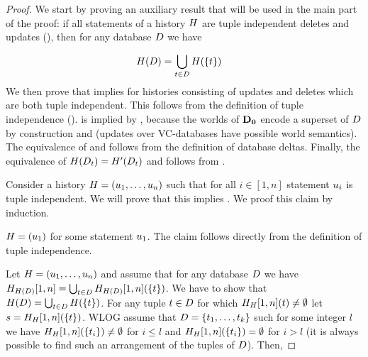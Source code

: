 \begin{proof}
  We start by proving an auxiliary result that will be used in the main part of the proof: if all statements of a history $H$ are tuple independent deletes and updates (), then for any database $D$ we have

  \begin{align}
    \label{eq:history-TI}
    H(D) &= \bigcup_{t \in D} H(\{t\})
  \end{align}
  We then prove that   implies  for histories consisting of updates and deletes which are both tuple independent. This follows from the definition of tuple independence ().  is implied by , because the  worlds of $\mathbf{D_0}$ encode a superset of $D$ by construction and  (updates over  VC-databases have possible world semantics). The equivalence of  and  follows from the definition of database deltas. Finally, the equivalence of $H(D_{t}) = H'(D_{t})$ and  follows from .

    Consider a history $H = (u_1, \ldots, u_n)$ such that for all $i \in [1,n]$ statement $u_i$ is tuple independent.  We will prove that this implies . We proof this claim by induction.

  $H = (u_1)$ for some statement $u_1$. The claim follows directly from the definition of tuple independence.

  Let $H = (u_1, \ldots, u_n)$ and assume that for any database $D$ we have $ H_{H(D)}{[1,n]} = \bigcup_{t \in D} H_{H(D)}{[1,n]}(\{t\})$. We have to show that $H(D) = \bigcup_{t \in D} H(\{t\})$. For any tuple $t \in D$ for which $H_{H}{[1,n]}(t) \neq \emptyset$  let $s = H_{H}{[1,n]}(\{t\})$. WLOG assume that $D = \{t_1, \ldots, t_k\}$ such for some integer $l$ we have $H_{H}{[1,n]}(\{t_i\}) \neq \emptyset$ for $i \leq l$ and $H_{H}{[1,n]}(\{t_i\}) = \emptyset$ for $i > l$  (it is always possible to find such an arrangement of the tuples of $D$). Then,


\end{proof}
